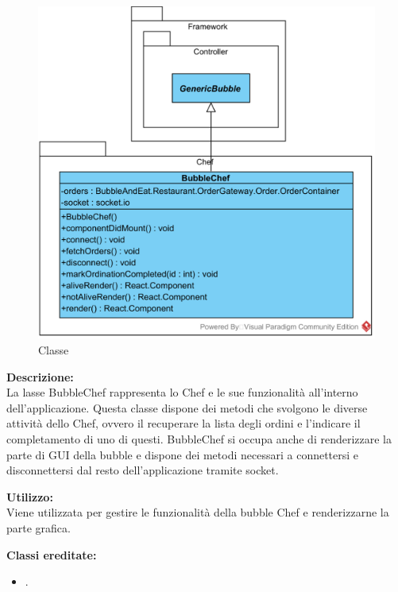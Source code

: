 \paragraph[::Restaurant::Chef::BubbleChef]{\class}\mbox{}\\ \label{\class}
\begin{figure}[H]
	\centering
	\includegraphics[width=12cm]{./diagrammi/demo/client/bubblechef.png}
	\caption{Classe \class}
\end{figure}
\textbf{Descrizione:}\\
La lasse BubbleChef rappresenta lo Chef e le sue funzionalità all'interno dell'applicazione. Questa classe dispone dei metodi che svolgono le diverse attività dello Chef, ovvero il recuperare la lista degli ordini e l'indicare il completamento di uno di questi. BubbleChef si occupa anche di renderizzare la parte di GUI della bubble e dispone dei metodi necessari a connettersi e disconnettersi dal resto dell'applicazione tramite socket.

\textbf{Utilizzo:}\\
Viene utilizzata per gestire le funzionalità della bubble Chef e renderizzarne la parte grafica.

\textbf{Classi ereditate:}
\begin{itemize}
	\item {}.
\end{itemize}


